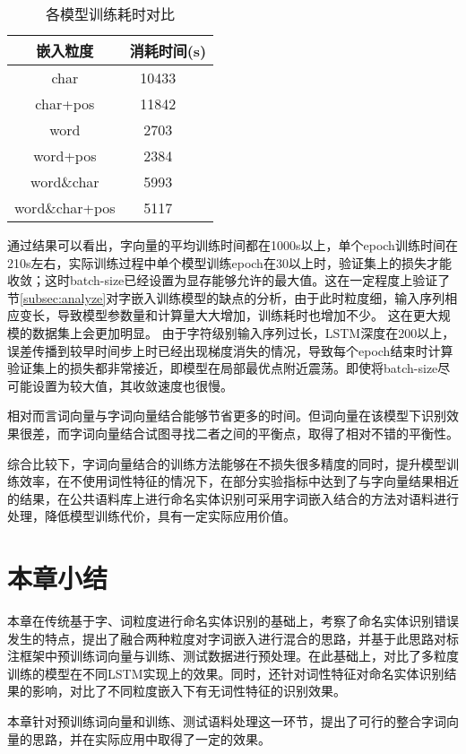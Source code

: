 \begin{table}[H]
    \centering
    \caption{各模型训练耗时对比}
    \begin{tabular}{ccc}
        \toprule
        嵌入粒度 & \multicolumn{2}{c}{消耗时间(s)}\\
        \midrule
        char  & 10433\\
        char+pos & 11842\\
        word  & 2703 \\
        word+pos  & 2384\\
        word\&char  & 5993\\
        word\&char+pos  & 5117 \\
        \bottomrule
    \end{tabular}
    \label{tab:train_time}
\end{table}

通过结果可以看出，字向量的平均训练时间都在1000s以上，单个epoch训练时间在210s左右，实际训练过程中单个模型训练epoch在30以上时，验证集上的损失才能收敛；这时batch-size已经设置为显存能够允许的最大值。这在一定程度上验证了节\ref{subsec:analyze}对字嵌入训练模型的缺点的分析，由于此时粒度细，输入序列相应变长，导致模型参数量和计算量大大增加，训练耗时也增加不少。
这在更大规模的数据集上会更加明显。
由于字符级别输入序列过长，LSTM深度在200以上，误差传播到较早时间步上时已经出现梯度消失的情况，导致每个epoch结束时计算验证集上的损失都非常接近，即模型在局部最优点附近震荡。即使将batch-size尽可能设置为较大值，其收敛速度也很慢。

相对而言词向量与字词向量结合能够节省更多的时间。但词向量在该模型下识别效果很差，而字词向量结合试图寻找二者之间的平衡点，取得了相对不错的平衡性。

综合比较下，字词向量结合的训练方法能够在不损失很多精度的同时，提升模型训练效率，在不使用词性特征的情况下，在部分实验指标中达到了与字向量结果相近的结果，在公共语料库上进行命名实体识别可采用字词嵌入结合的方法对语料进行处理，降低模型训练代价，具有一定实际应用价值。

\section{本章小结}
本章在传统基于字、词粒度进行命名实体识别的基础上，考察了命名实体识别错误发生的特点，提出了融合两种粒度对字词嵌入进行混合的思路，并基于此思路对标注框架中预训练词向量与训练、测试数据进行预处理。在此基础上，对比了多粒度训练的模型在不同LSTM实现上的效果。同时，还针对词性特征对命名实体识别结果的影响，对比了不同粒度嵌入下有无词性特征的识别效果。

本章针对预训练词向量和训练、测试语料处理这一环节，提出了可行的整合字词向量的思路，并在实际应用中取得了一定的效果。
